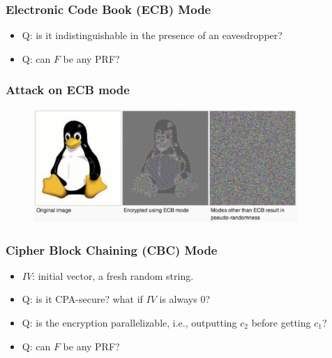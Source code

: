 \begin{frame}\frametitle{Electronic Code Book (ECB) Mode}
\begin{figure}
\begin{center}

\end{center}
\end{figure}
\begin{itemize}
\item \alert{Q: is it indistinguishable in the presence of an eavesdropper?}
\item \alert{Q: can $F$ be any PRF?}
\end{itemize}
\end{frame}
\begin{frame}\frametitle{Attack on ECB mode}
\begin{figure}
\begin{center}
\includegraphics[width=100mm]{pic/ecb} 
\end{center}
\end{figure}
\end{frame}
\begin{frame}\frametitle{Cipher Block Chaining (CBC) Mode}
\begin{figure}
\begin{center}

\end{center}
\end{figure}
\begin{itemize}
\item $IV$: initial vector, a fresh random string.
\item \alert{Q: is it CPA-secure? what if $IV$ is always $0$?}
\item \alert{Q: is the encryption parallelizable, i.e., outputting $c_{2}$ before getting $c_{1}$?}
\item \alert{Q: can $F$ be any PRF?}
\end{itemize}
\end{frame}
